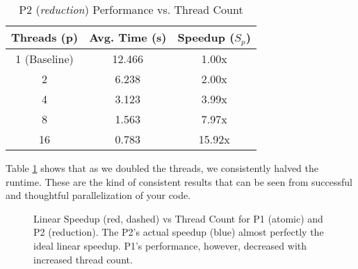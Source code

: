 \documentclass[twocolumn]{article}
\begin{document}
\begin{table}[H]
  \centering
  \caption{P2 (\textit{reduction}) Performance vs. Thread Count}
  \label{tab:p2_runtimes}
  \begin{tabular}{@{}ccc@{}}
    \toprule
    {Threads (p)}&{Avg. Time (s)} & {Speedup ($S_p$)}\\
    \midrule
    {1 (Baseline)} & {12.466} & {1.00x}\\
    {2} & {6.238} & {2.00x}\\
    {4} & {3.123} & {3.99x}\\
    {8} & {1.563} & {7.97x}\\
    {16}& {0.783} & {15.92x}\\
    \bottomrule
  \end{tabular}
\end{table}

Table \ref{tab:p2_runtimes} shows that as we doubled the threads, we consistently halved the runtime. These are the kind of consistent results that can be seen from successful and thoughtful parallelization of your code.

\begin{figure}[h!]
  \centering
  \caption{Linear Speedup (red, dashed) vs Thread Count for P1 (atomic) and P2 (reduction). The P2's actual speedup (blue) almost perfectly the ideal linear speedup. P1's performance, however, decreased with increased thread count.}
  \label{fig:speedup}
\end{figure}
\end{document}

